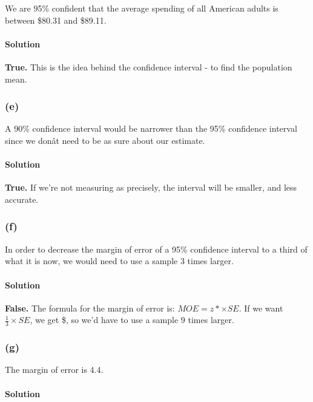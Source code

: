 \documentclass[]{article}
\let\oldparagraph\paragraph
\renewcommand{\paragraph}[1]{\oldparagraph{#1}\mbox{}}
\begin{document}
We are 95\% confident that the average spending of all American adults
is between \$80.31 and \$89.11.

\paragraph{Solution}\label{solution-8}

\textbf{True.} This is the idea behind the confidence interval - to find
the population mean.

\subsubsection{(e)}\label{e-1}

A 90\% confidence interval would be narrower than the 95\% confidence
interval since we donât need to be as sure about our estimate.

\paragraph{Solution}\label{solution-9}

\textbf{True.} If we're not measuring as precisely, the interval will be
smaller, and less accurate.

\subsubsection{(f)}\label{f}

In order to decrease the margin of error of a 95\% confidence interval
to a third of what it is now, we would need to use a sample 3 times
larger.

\paragraph{Solution}\label{solution-10}

\textbf{False.} The formula for the margin of error is:
\(MOE = z* \times SE\). If we want \(\frac{1}{3}\times SE\), we get
\$, so we'd have to use a sample 9 times
larger.

\subsubsection{(g)}\label{g}

The margin of error is 4.4.

\paragraph{Solution}\label{solution-11}
\end{document}
